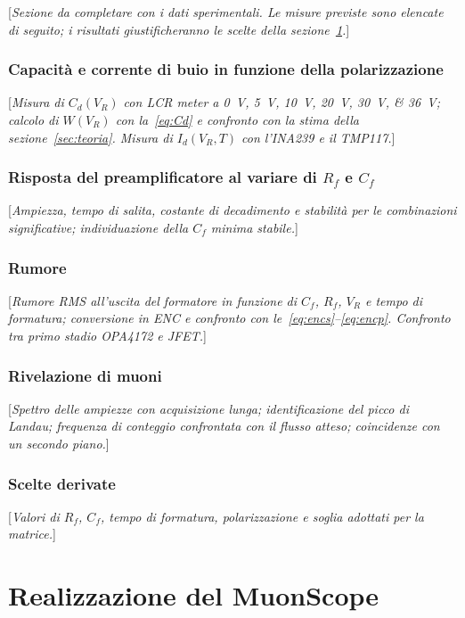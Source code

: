 \documentclass[11pt,a4paper]{article}
\newcommand{\dadefinire}[1]{\textcolor{red!70!black}{[\emph{#1}]}}
\begin{document}
\dadefinire{Sezione da completare con i dati sperimentali. Le misure previste sono elencate di seguito; i risultati giustificheranno le scelte della sezione~\ref{sec:muonscope}.}

\subsubsection{Capacità e corrente di buio in funzione della polarizzazione}
\dadefinire{Misura di $C_d(V_R)$ con LCR meter a \SIlist{0;5;10;20;30;36}{\volt}; calcolo di $W(V_R)$ con la~\eqref{eq:Cd} e confronto con la stima della sezione~\ref{sec:teoria}. Misura di $I_d(V_R,T)$ con l'INA239 e il TMP117.}

\subsubsection{Risposta del preamplificatore al variare di $R_f$ e $C_f$}
\dadefinire{Ampiezza, tempo di salita, costante di decadimento e stabilità per le combinazioni significative; individuazione della $C_f$ minima stabile.}

\subsubsection{Rumore}
\dadefinire{Rumore RMS all'uscita del formatore in funzione di $C_f$, $R_f$, $V_R$ e tempo di formatura; conversione in ENC e confronto con le~\eqref{eq:encs}--\eqref{eq:encp}. Confronto tra primo stadio OPA4172 e JFET.}

\subsubsection{Rivelazione di muoni}
\dadefinire{Spettro delle ampiezze con acquisizione lunga; identificazione del picco di Landau; frequenza di conteggio confrontata con il flusso atteso; coincidenze con un secondo piano.}

\subsubsection{Scelte derivate}
\dadefinire{Valori di $R_f$, $C_f$, tempo di formatura, polarizzazione e soglia adottati per la matrice.}

\section{Realizzazione del MuonScope}\label{sec:muonscope}
\end{document}
